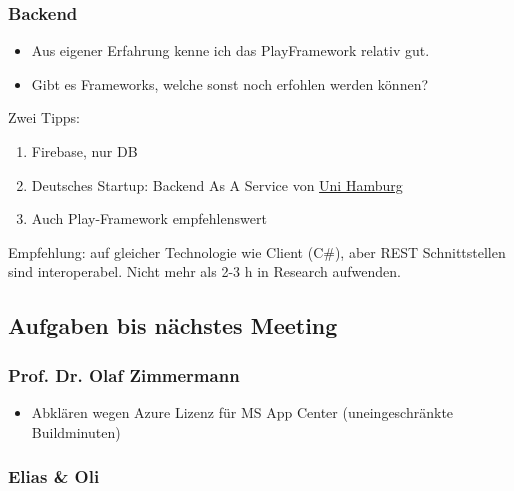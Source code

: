 \hypertarget{backend}{%
\subsubsection*{Backend}\label{backend}}

\begin{itemize}

\item
  Aus eigener Erfahrung kenne ich das PlayFramework relativ gut.
\item
  Gibt es Frameworks, welche sonst noch erfohlen werden können?
\end{itemize}

Zwei Tipps:

\begin{enumerate}
\def\labelenumi{\arabic{enumi}.}

\item
  Firebase, nur DB
\item
  Deutsches Startup: Backend As A Service von \href{https://vsis-www.informatik.uni-hamburg.de/getDoc.php/publications/522/Towards\%20a\%20Scalable\%20and\%20Unified\%20REST\%20API\%20for\%20Cloud\%20Data\%20Stores.pdf}{Uni Hamburg}
\item
  Auch Play-Framework empfehlenswert
\end{enumerate}

Empfehlung: auf gleicher Technologie wie Client (C\#), aber REST
Schnittstellen sind interoperabel. Nicht mehr als 2-3 h in Research
aufwenden.

\hypertarget{aufgaben-bis-nachstes-meeting}{%
\subsection*{Aufgaben bis nächstes
Meeting}\label{aufgaben-bis-nachstes-meeting}}

\hypertarget{prof.-dr.-olaf-zimmermann}{%
\subsubsection*{Prof. Dr. Olaf
Zimmermann}\label{prof.-dr.-olaf-zimmermann}}

\begin{itemize}

\item
  Abklären wegen Azure Lizenz für MS App Center (uneingeschränkte
  Buildminuten)
\end{itemize}

\hypertarget{elias-ux5cux26-oli}{%
\subsubsection*{Elias \& Oli}\label{elias-ux5cux26-oli}}

